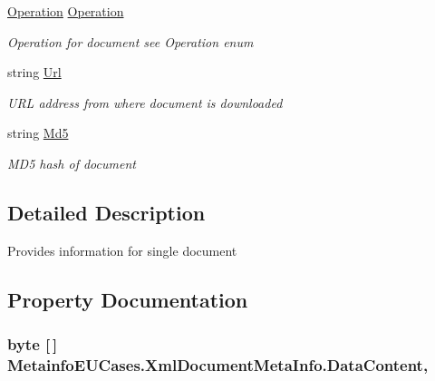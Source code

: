 \begin{DoxyCompactItemize}
\hyperlink{namespace_metainfo_e_u_cases_a31e7a82bcb29caae96833aaadc2809c5}{Operation} \hyperlink{class_metainfo_e_u_cases_1_1_xml_document_meta_info_a9671a5e22bc342730f75ec4d50880539}{Operation}
\begin{DoxyCompactList}\small\item\em Operation for document see Operation enum \end{DoxyCompactList}\item 
string \hyperlink{class_metainfo_e_u_cases_1_1_xml_document_meta_info_a713b2a1168b315354a4d0e47aba855d6}{Url}
\begin{DoxyCompactList}\small\item\em U\-R\-L address from where document is downloaded \end{DoxyCompactList}\item 
string \hyperlink{class_metainfo_e_u_cases_1_1_xml_document_meta_info_a6eeb8c74f856afe415d9d9fa4ade30e7}{Md5}
\begin{DoxyCompactList}\small\item\em M\-D5 hash of document \end{DoxyCompactList}\end{DoxyCompactItemize}


\subsection{Detailed Description}
Provides information for single document 



\subsection{Property Documentation}
\hypertarget{class_metainfo_e_u_cases_1_1_xml_document_meta_info_afd47cd5b646ea8912d185b850e83c541}{
\subsubsection[{Data\-Content}]{\setlength{\rightskip}{0pt plus 5cm}byte \mbox{[}$\,$\mbox{]} Metainfo\-E\-U\-Cases.\-Xml\-Document\-Meta\-Info.\-Data\-Content\hspace{0.3cm}{\ttfamily [get]}, {\ttfamily [set]}}}\label{class_metainfo_e_u_cases_1_1_xml_document_meta_info_afd47cd5b646ea8912d185b850e83c541}


